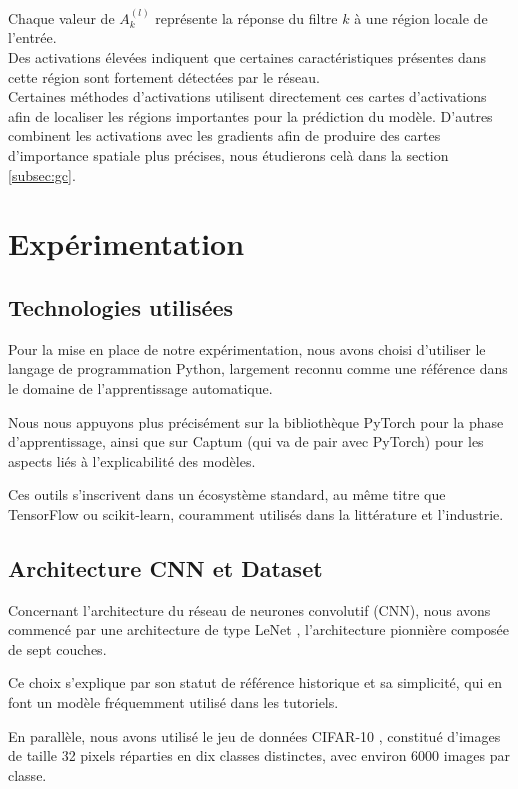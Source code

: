 \documentclass{ir}
\begin{document}
Chaque valeur de $A_k^{(l)}$ représente la réponse du filtre $k$ à une région locale de l'entrée.\\

Des activations élevées indiquent que certaines caractéristiques présentes dans cette région sont fortement détectées par le réseau.\\

Certaines méthodes d'activations utilisent directement ces cartes d'activations afin de localiser les régions importantes pour la prédiction du modèle.
D'autres combinent les activations avec les gradients afin de produire des cartes d'importance spatiale plus précises, nous étudierons celà dans la section \ref{subsec:gc}.

\section{Expérimentation}

\subsection{Technologies utilisées}

Pour la mise en place de notre expérimentation, nous avons choisi d'utiliser le langage de programmation Python, largement reconnu comme une référence dans le domaine de l'apprentissage automatique.

Nous nous appuyons plus précisément sur la bibliothèque PyTorch pour la phase d'apprentissage, ainsi que sur Captum (qui va de pair avec PyTorch) pour les aspects liés à l'explicabilité des modèles.

Ces outils s'inscrivent dans un écosystème standard, au même titre que TensorFlow ou scikit-learn, couramment utilisés dans la littérature et l'industrie.


\subsection{Architecture CNN et Dataset}
Concernant l'architecture du réseau de neurones convolutif (CNN), nous avons commencé par une architecture de type LeNet \cite{lecun98lenet}, l'architecture pionnière composée de sept couches.

Ce choix s'explique par son statut de référence historique et sa simplicité, qui en font un modèle fréquemment utilisé dans les tutoriels.

En parallèle, nous avons utilisé le jeu de données CIFAR-10 \cite{krizhevsky09cifar10}, constitué d'images de taille 32 pixels réparties en dix classes distinctes, avec environ 6000 images par classe.
\end{document}
